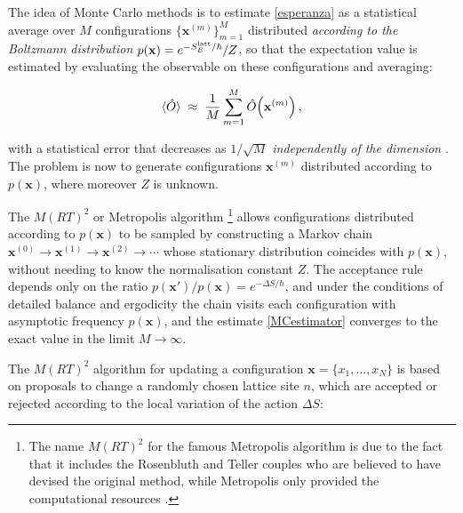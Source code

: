 \documentclass[11pt,a4paper,twoside,pdf]{article}
\numberwithin{equation}{section}
\begin{document}
The idea of Monte Carlo methods is to estimate \ref{esperanza} as a statistical average over $M$ configurations $\{\mathbf{x}^{(m)}\}_{m=1}^{M}$ distributed \emph{according to the Boltzmann distribution} $p(\mathbf{x}) = e^{-S_E^{\rm latt}/\hbar}/Z$, so that the expectation value is estimated by evaluating the observable on these configurations and averaging:

\begin{equation}
    \braket{\hat{O}} \;\approx\; \frac{1}{M}\sum_{m=1}^{M} \hat{O}\!\left(\mathbf{x}^{(m)}\right),
    \label{MCestimator}
\end{equation}

with a statistical error that decreases as $1/\sqrt{M}$ \emph{independently of the dimension} \cite{kalos2008monte}. The problem is now to generate configurations $\mathbf{x}^{(m)}$ distributed according to $p(\mathbf{x})$, where moreover $Z$ is unknown.\bigskip


The $M(RT)^2$ or Metropolis algorithm \footnote{The name $M(RT)^2$ for the famous Metropolis algorithm is due to the fact that it includes the Rosenbluth and Teller couples who are believed to have devised the original method, while Metropolis only provided the computational resources \cite{kalos2008monte}.} \cite{metropolis1953equation} allows configurations distributed according to $p(\mathbf{x})$ to be sampled by constructing a Markov chain $\mathbf{x}^{(0)}\to \mathbf{x}^{(1)}\to \mathbf{x}^{(2)}\to\cdots$ whose stationary distribution coincides with $p(\mathbf{x})$, without needing to know the normalisation constant $Z$. The acceptance rule depends only on the ratio $p(\mathbf{x}')/p(\mathbf{x}) = e^{-\Delta S/\hbar}$, and under the conditions of detailed balance and ergodicity the chain visits each configuration with asymptotic frequency $p(\mathbf{x})$, and the estimate \ref{MCestimator} converges to the exact value in the limit $M \to \infty$.\medskip


The $M(RT)^2$ algorithm for updating a configuration $\mathbf{x} = \{x_1, \ldots, x_N\}$ is based on proposals to change a randomly chosen lattice site $n$, which are accepted or rejected according to the local variation of the action $\Delta S$:
\end{document}
